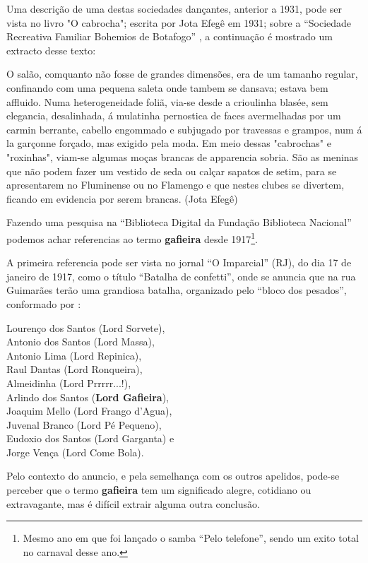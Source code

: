 Uma descrição de uma destas sociedades dançantes, anterior a 1931, pode ser vista no livro "O cabrocha"; 
escrita  por Jota Efegê em 1931; 
sobre a ``Sociedade Recreativa Familiar Bohemios de Botafogo'' \cite[pp. 24-26]{jotaefege},
a continuação é mostrado um extracto desse texto:
\begin{citando}%
O salão, comquanto não fosse de grandes dimensões, era
de um tamanho regular, confinando com uma pequena saleta
onde tambem se dansava; estava bem affluido. Numa
heterogeneidade foliã, via-se desde a crioulinha blasée, sem
elegancia, desalinhada, á mulatinha pernostica de faces
avermelhadas por um carmin berrante, cabello engommado e
subjugado por travessas e grampos, num á la garçonne
forçado, mas exigido pela moda. Em meio dessas "cabrochas"
e "roxinhas", viam-se algumas moças brancas de apparencia
sobria. São as meninas que não podem fazer um vestido de
seda ou calçar sapatos de setim, para se apresentarem no
Fluminense ou no Flamengo e que nestes clubes se divertem,
ficando em evidencia por serem brancas.  %
(Jota Efegê)
\end{citando}


Fazendo uma pesquisa na ``Biblioteca Digital da Fundação Biblioteca Nacional''
podemos achar referencias ao termo \textbf{gafieira} desde 1917\footnote{Mesmo 
ano em que foi lançado o samba ``Pelo telefone'', sendo um exito total no carnaval desse ano.}.


A primeira referencia pode ser vista no jornal ``O Imparcial'' (RJ),
do dia 17 de janeiro de 1917, como o título ``Batalha de confetti'',
onde se anuncia que na rua Guimarães terão uma grandiosa batalha,
organizado pelo ``bloco dos pesados'', conformado por \cite[pp. 4]{oldgafieira1} \cite[pp. 629]{spielmann2016reflexoes}:
\begin{citando}
Lourenço dos Santos (Lord Sorvete),\\
Antonio dos Santos (Lord Massa),\\
Antonio Lima (Lord Repinica),\\
Raul Dantas (Lord Ronqueira),\\
Almeidinha (Lord Prrrrr...!),\\
Arlindo dos Santos (\textbf{Lord Gafieira}),\\
Joaquim Mello (Lord Frango d'Agua),\\
Juvenal Branco (Lord Pé Pequeno),\\
Eudoxio dos Santos (Lord Garganta) e\\
Jorge Vença (Lord Come Bola).
\end{citando}
Pelo contexto do anuncio, e pela semelhança com os outros apelidos, 
pode-se perceber que o termo \textbf{gafieira} tem um significado alegre,
cotidiano ou extravagante, mas é difícil extrair alguma outra conclusão.


